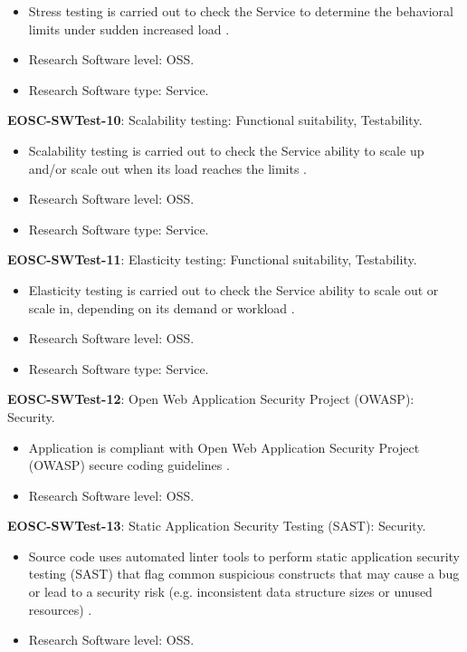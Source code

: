 \begin{itemize}
    \item Stress testing is carried out to check the Service to determine the behavioral limits under sudden increased load \cite{orviz_fernandez_eosc-synergy_2020}.
    \item Research Software level: OSS.
    \item Research Software type: Service.
\end{itemize}

\textbf{EOSC-SWTest-10}: Scalability testing: Functional suitability, Testability.

\begin{itemize}
    \item Scalability testing is carried out to check the Service ability to scale up and/or scale out when its load reaches the limits \cite{orviz_fernandez_eosc-synergy_2020}.
    \item Research Software level: OSS.
    \item Research Software type: Service.
\end{itemize}

\textbf{EOSC-SWTest-11}: Elasticity testing: Functional suitability, Testability.

\begin{itemize}
    \item Elasticity testing is carried out to check the Service ability to scale out or scale in, depending on its demand or workload \cite{orviz_fernandez_eosc-synergy_2020}.
    \item Research Software level: OSS.
    \item Research Software type: Service.
\end{itemize}

\textbf{EOSC-SWTest-12}: Open Web Application Security Project (OWASP): Security.

\begin{itemize}
    \item Application is compliant with Open Web Application Security Project (OWASP) secure coding guidelines \cite{orviz_set_2017}.
    \item Research Software level: OSS.
\end{itemize}

\textbf{EOSC-SWTest-13}: Static Application Security Testing (SAST): Security.

\begin{itemize}
    \item Source code uses automated linter tools to perform static application security testing (SAST) that flag common suspicious constructs that may cause a bug or lead to a security risk (e.g. inconsistent data structure sizes or unused resources) \cite{orviz_set_2017}.
    \item Research Software level: OSS.
\end{itemize}

